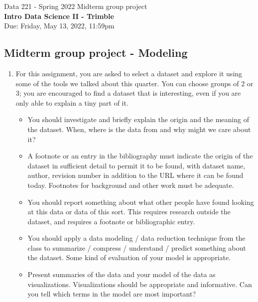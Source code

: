 \documentclass[]{book}
\theoremstyle{definition}
\begin{document}
\begin{center}
{\Large Data 221 - Spring 2022 \hspace{0.5cm} Midterm group project }\\
\textbf{Intro Data Science II - Trimble}\\ %
Due:  Friday, May 13, 2022, 11:59pm
\end{center}

\vspace{0.2 cm}

\subsection*{Midterm group project - Modeling }

\begin{enumerate}
\item\label{norms}

For this assignment, you are asked to select a dataset and explore it using some of the tools we talked about this quarter.  You can choose groups of 2 or 3; you are encouraged to find a dataset that is interesting, even if you are only able to explain a tiny part of it.

\begin{itemize}
\item  You should investigate and briefly explain the origin and the meaning of the dataset.  When, where is the data from and why might we care about it?  


\item A footnote or an entry in the bibliography must indicate the origin of the dataset in sufficient detail to permit it to be found, with dataset name, author, revision number in addition to the URL where it can be found today.  Footnotes for background and other work must be adequate. 

\item You should report something about what other people have found looking at this data or data of this sort.  This requires research outside the dataset, and requires a footnote or bibliographic entry.

\item You should apply a data modeling / data reduction technique from the class to summarize / compress / understand / predict something about the dataset.  Some kind of evaluation of your model is appropriate.

\item  Present summaries of the data and your model of the data as visualizations.  Visualizations should be appropriate and informative.  Can you tell which terms in the model are most important?


\end{itemize}
\end{enumerate}
\end{document}
